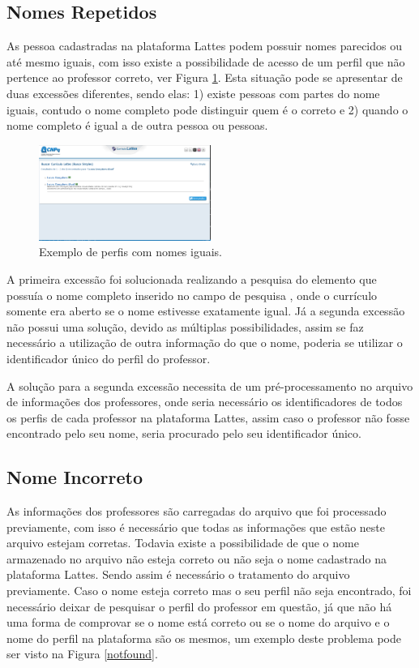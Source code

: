 \documentclass[conference]{IEEEtran}
\begin{document}
\subsection{Nomes Repetidos}
As pessoa cadastradas na plataforma Lattes podem possuir nomes parecidos ou até mesmo iguais, com isso existe a possibilidade de acesso de um perfil que não pertence ao professor correto, ver Figura \ref{mnome}. Esta situação pode se apresentar de duas excessões diferentes, sendo elas: 1) existe pessoas com partes do nome iguais, contudo o nome completo pode distinguir quem é o correto e 2) quando o nome completo é igual a de outra pessoa ou pessoas.

\begin{figure}[htbp]
\centerline{\includegraphics[width=0.5\textwidth]{exemplo2.png}}
\caption{Exemplo de perfis com nomes iguais.}
\label{mnome}
\end{figure}

A primeira excessão foi solucionada realizando a pesquisa do elemento que possuía o nome completo inserido no campo de pesquisa , onde o currículo somente era aberto se o nome estivesse exatamente igual. Já a segunda excessão não possui uma solução, devido as múltiplas possibilidades, assim se faz necessário a utilização de outra informação do que o nome, poderia se utilizar o identificador único do perfil do professor.

A solução para a segunda excessão necessita de um pré-processamento no arquivo de informações dos professores, onde seria necessário os identificadores de todos os perfis de cada professor na plataforma Lattes, assim caso o professor não fosse encontrado pelo seu nome, seria procurado pelo seu identificador único.

\subsection{Nome Incorreto}
As informações dos professores são carregadas do arquivo que foi processado previamente, com isso é necessário que todas as informações que estão neste arquivo estejam corretas. Todavia existe a possibilidade de que o nome armazenado no arquivo não esteja correto ou não seja o nome cadastrado na plataforma Lattes. Sendo assim é necessário o tratamento do arquivo previamente. Caso o nome esteja correto mas o seu perfil não seja encontrado, foi necessário deixar de pesquisar o perfil do professor em questão, já que não há uma forma de comprovar se o nome está correto ou se o nome do arquivo e o nome do perfil na plataforma são os mesmos, um exemplo deste problema pode ser visto na Figura \ref{notfound}.
\end{document}
